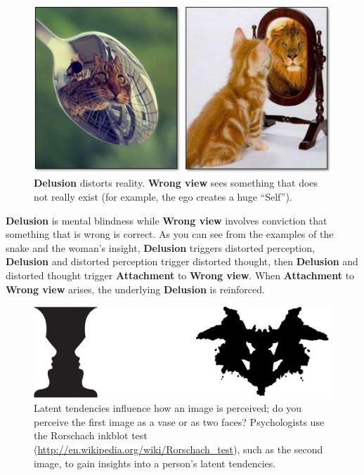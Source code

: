 \begin{figure}[H]

\centering
\includegraphics[width=0.8\linewidth]{./Diagrams/Cats}
\caption{\textbf{Delusion} distorts reality. \textbf{Wrong view} sees something that does not really exist (for example, the ego creates a huge “Self”).}
\label{fig:Cats}
\end{figure}

\textbf{Delusion} is mental blindness while \textbf{Wrong view} involves conviction that something that is wrong is correct. As you can see from the examples of the snake and the woman's insight, \textbf{Delusion} triggers distorted perception, \textbf{Delusion} and distorted perception trigger distorted thought, then \textbf{Delusion} and distorted thought trigger \textbf{Attachment} to \textbf{Wrong view}. When \textbf{Attachment} to \textbf{Wrong view} arises, the underlying \textbf{Delusion} is reinforced.

\pagebreak

\begin{figure}[H]
\centering
\includegraphics[width=0.9\linewidth]{./Diagrams/Perception}
\caption{Latent tendencies influence how an image is perceived; do you perceive the first image as a vase or as two faces? Psychologists use the Rorschach inkblot test (\url{http://en.wikipedia.org/wiki/Rorschach_test}), such as the second image, to gain insights into a person’s latent tendencies.}
\label{fig:Perception}
\end{figure}

